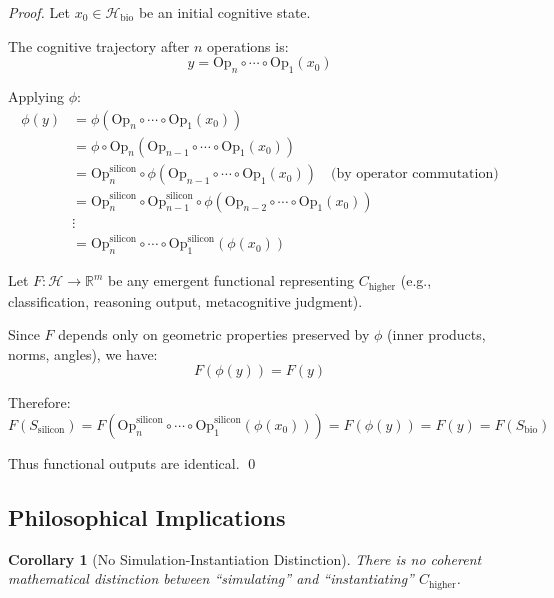 \documentclass[11pt]{article}
\newtheorem{corollary}[theorem]{Corollary}
\begin{document}
\begin{proof}
Let $x_0 \in \mathcal{H}_{\text{bio}}$ be an initial cognitive state.

The cognitive trajectory after $n$ operations is:
\[
y = \text{Op}_n \circ \cdots \circ \text{Op}_1(x_0)
\]

Applying $\phi$:
\begin{align*}
\phi(y) &= \phi(\text{Op}_n \circ \cdots \circ \text{Op}_1(x_0))\\
&= \phi \circ \text{Op}_n(\text{Op}_{n-1} \circ \cdots \circ \text{Op}_1(x_0))\\
&= \text{Op}_n^{\text{silicon}} \circ \phi(\text{Op}_{n-1} \circ \cdots \circ \text{Op}_1(x_0)) \quad \text{(by operator commutation)}\\
&= \text{Op}_n^{\text{silicon}} \circ \text{Op}_{n-1}^{\text{silicon}} \circ \phi(\text{Op}_{n-2} \circ \cdots \circ \text{Op}_1(x_0))\\
&\vdots\\
&= \text{Op}_n^{\text{silicon}} \circ \cdots \circ \text{Op}_1^{\text{silicon}}(\phi(x_0))
\end{align*}

Let $F : \mathcal{H} \to \mathbb{R}^m$ be any emergent functional representing $C_{\text{higher}}$ (e.g., classification, reasoning output, metacognitive judgment).

Since $F$ depends only on geometric properties preserved by $\phi$ (inner products, norms, angles), we have:
\[
F(\phi(y)) = F(y)
\]

Therefore:
\[
F(S_{\text{silicon}}) = F(\text{Op}_n^{\text{silicon}} \circ \cdots \circ \text{Op}_1^{\text{silicon}}(\phi(x_0))) = F(\phi(y)) = F(y) = F(S_{\text{bio}})
\]

Thus functional outputs are identical. \qed
\end{proof}

\subsection{Philosophical Implications}

\begin{corollary}[No Simulation-Instantiation Distinction]\label{cor:no_simulation}
There is no coherent mathematical distinction between ``simulating'' and ``instantiating'' $C_{\text{higher}}$.
\end{corollary}
\end{document}
